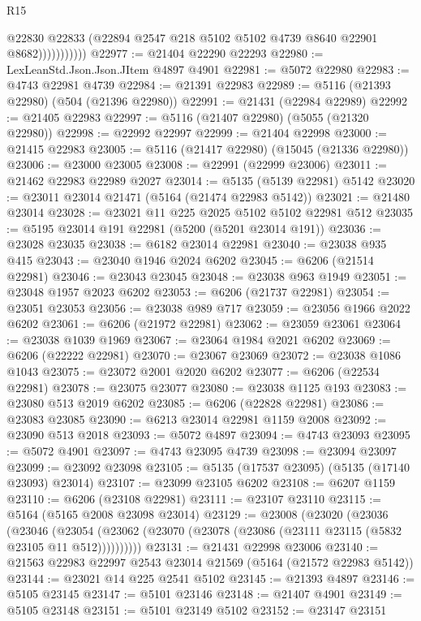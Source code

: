 \begin{lexlean}{R15}
\begin{coremodule}
{{{{{{{{{{{                        @22830
                        @22833
                        (@22894 @2547 @218 @5102 @5102 @4739 @8640 @22901 @8682)))))))))))
@22977 := @21404 @22290 @22293
@22980 := LexLeanStd.Json.Json.JItem @4897 @4901
@22981 := @5072 @22980
@22983 := @4743 @22981 @4739
@22984 := @21391 @22983
@22989 := @5116 (@21393 @22980) (@504 (@21396 @22980))
@22991 := @21431 (@22984 @22989)
@22992 := @21405 @22983
@22997 := @5116 (@21407 @22980) (@5055 (@21320 @22980))
@22998 := @22992 @22997
@22999 := @21404 @22998
@23000 := @21415 @22983
@23005 := @5116 (@21417 @22980) (@15045 (@21336 @22980))
@23006 := @23000 @23005
@23008 := @22991 (@22999 @23006)
@23011 := @21462 @22983 @22989 @2027
@23014 := @5135 (@5139 @22981) @5142
@23020 := @23011 @23014 @21471 (@5164 (@21474 @22983 @5142))
@23021 := @21480 @23014
@23028 := @23021 @11 @225 @2025 @5102 @5102 @22981 @512
@23035 := @5195 @23014 @191 @22981 (@5200 (@5201 @23014 @191))
@23036 := @23028 @23035
@23038 := @6182 @23014 @22981
@23040 := @23038 @935 @415
@23043 := @23040 @1946 @2024 @6202
@23045 := @6206 (@21514 @22981)
@23046 := @23043 @23045
@23048 := @23038 @963 @1949
@23051 := @23048 @1957 @2023 @6202
@23053 := @6206 (@21737 @22981)
@23054 := @23051 @23053
@23056 := @23038 @989 @717
@23059 := @23056 @1966 @2022 @6202
@23061 := @6206 (@21972 @22981)
@23062 := @23059 @23061
@23064 := @23038 @1039 @1969
@23067 := @23064 @1984 @2021 @6202
@23069 := @6206 (@22222 @22981)
@23070 := @23067 @23069
@23072 := @23038 @1086 @1043
@23075 := @23072 @2001 @2020 @6202
@23077 := @6206 (@22534 @22981)
@23078 := @23075 @23077
@23080 := @23038 @1125 @193
@23083 := @23080 @513 @2019 @6202
@23085 := @6206 (@22828 @22981)
@23086 := @23083 @23085
@23090 := @6213 @23014 @22981 @1159 @2008
@23092 := @23090 @513 @2018
@23093 := @5072 @4897
@23094 := @4743 @23093
@23095 := @5072 @4901
@23097 := @4743 @23095 @4739
@23098 := @23094 @23097
@23099 := @23092 @23098
@23105 := @5135 (@17537 @23095) (@5135 (@17140 @23093) @23014)
@23107 := @23099 @23105 @6202
@23108 := @6207 @1159
@23110 := @6206 (@23108 @22981)
@23111 := @23107 @23110
@23115 := @5164 (@5165 @2008 @23098 @23014)
@23129 := @23008
    (@23020
      (@23036
        (@23046
          (@23054 (@23062 (@23070 (@23078 (@23086 (@23111 @23115 (@5832 @23105 @11 @512))))))))))
@23131 := @21431 @22998 @23006
@23140 := @21563 @22983 @22997 @2543 @23014 @21569 (@5164 (@21572 @22983 @5142))
@23144 := @23021 @14 @225 @2541 @5102
@23145 := @21393 @4897
@23146 := @5105 @23145
@23147 := @5101 @23146
@23148 := @21407 @4901
@23149 := @5105 @23148
@23151 := @5101 @23149 @5102
@23152 := @23147 @23151
}}}}}}}}}}}
\end{coremodule}
\end{lexlean}
